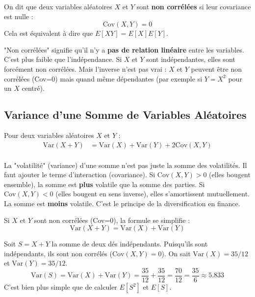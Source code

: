 \begin{definitionbox}
On dit que deux variables aléatoires $X$ et $Y$ sont \textbf{non corrélées} si leur covariance est nulle :
$$\text{Cov}(X,Y) = 0$$
Cela est équivalent à dire que $E[XY] = E[X]E[Y]$.
\end{definitionbox}

\begin{intuitionbox}
"Non corrélées" signifie qu'il n'y a \textbf{pas de relation linéaire} entre les variables. C'est plus faible que l'indépendance. Si $X$ et $Y$ sont indépendantes, elles sont forcément non corrélées. Mais l'inverse n'est pas vrai : $X$ et $Y$ peuvent être non corrélées (Cov=0) mais quand même dépendantes (par exemple si $Y=X^2$ pour un $X$ centré).
\end{intuitionbox}

\subsection{Variance d'une Somme de Variables Aléatoires}

\begin{theorembox}
Pour deux variables aléatoires $X$ et $Y$ :
\begin{align*}
\text{Var}(X+Y) &= \text{Var}(X) + \text{Var}(Y) + 2\text{Cov}(X,Y) \\
\end{align*}
\end{theorembox}

\begin{intuitionbox}
La "volatilité" (variance) d'une somme n'est pas juste la somme des volatilités. Il faut ajouter le terme d'interaction (covariance).
Si $\text{Cov}(X,Y) > 0$ (elles bougent ensemble), la somme est \textbf{plus} volatile que la somme des parties.
Si $\text{Cov}(X,Y) < 0$ (elles bougent en sens inverse), elles s'amortissent mutuellement. La somme est \textbf{moins} volatile. C'est le principe de la diversification en finance.
\end{intuitionbox}

\begin{theorembox}
Si $X$ et $Y$ sont non corrélées (Cov=0), la formule se simplifie :
$$\text{Var}(X+Y) = \text{Var}(X) + \text{Var}(Y)$$
\end{theorembox}

\begin{examplebox}
Soit $S = X+Y$ la somme de deux dés indépendants.
Puisqu'ils sont indépendants, ils sont non corrélés ($\text{Cov}(X,Y)=0$).
On sait $\text{Var}(X) = 35/12$ et $\text{Var}(Y) = 35/12$.
$$\text{Var}(S) = \text{Var}(X) + \text{Var}(Y) = \frac{35}{12} + \frac{35}{12} = \frac{70}{12} = \frac{35}{6} \approx 5.833$$
C'est bien plus simple que de calculer $E[S^2]$ et $E[S]$.
\end{examplebox}

